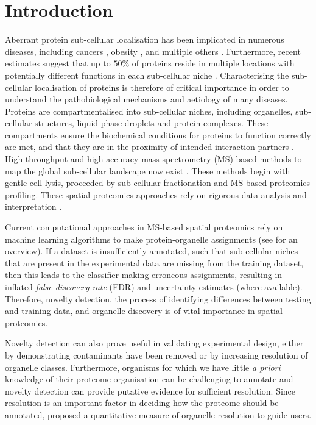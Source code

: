 \documentclass[12pt,english]{article}
\begin{document}
\section{Introduction}
Aberrant protein sub-cellular localisation has been implicated in numerous diseases, including cancers \citep{Kau:2004}, obesity \citep{Siljee:2018}, and multiple others \citep{Laurila:2009}. Furthermore, recent estimates suggest that up to $50\%$ of proteins reside in multiple locations with potentially different functions in each sub-cellular niche \citep{hyper, Thul:2017}. Characterising the sub-cellular localisation of proteins is therefore of critical importance in order to understand the pathobiological mechanisms and aetiology of many diseases. Proteins are compartmentalised into sub-cellular niches, including organelles, sub-cellular structures, liquid phase droplets and protein complexes. These compartments ensure the biochemical conditions for proteins to function correctly are met, and that they are in the proximity of intended interaction partners \citep{Gibson:2009}. High-throughput and high-accuracy mass spectrometry (MS)-based methods to map the global sub-cellular landscape now exist \citep{hyper, Mulvey:2017, DC:2018, Orre:2019}. These methods begin with gentle cell lysis, proceeded by sub-cellular fractionation and MS-based proteomics profiling. These spatial proteomics approaches rely on rigorous data analysis and interpretation \citep{Gatto:2010, Gatto:2014b}.

Current computational approaches in MS-based spatial proteomics rely on machine learning algorithms to make protein-organelle assignments (see \citep{Gatto:2014b} for an overview). If a dataset is insufficiently annotated, such that sub-cellular niches that are present in the experimental data are missing from the training dataset, then this leads to the classifier making erroneous assignments, resulting in inflated \textit{false discovery rate} (FDR) and uncertainty estimates (where available). Therefore, novelty detection, the process of identifying differences between testing and training data, and organelle discovery is of vital importance in spatial proteomics.

Novelty detection can also prove useful in validating experimental design, either by demonstrating contaminants have been removed or by increasing resolution of organelle classes. Furthermore, organisms for which we have little \textit{a priori} knowledge of their proteome organisation can be challenging to annotate and novelty detection can provide putative evidence for sufficient resolution. Since resolution is an important factor in deciding how the proteome should be annotated, \cite{Gatto:2018} proposed a quantitative measure of organelle resolution to guide users.
\end{document}
